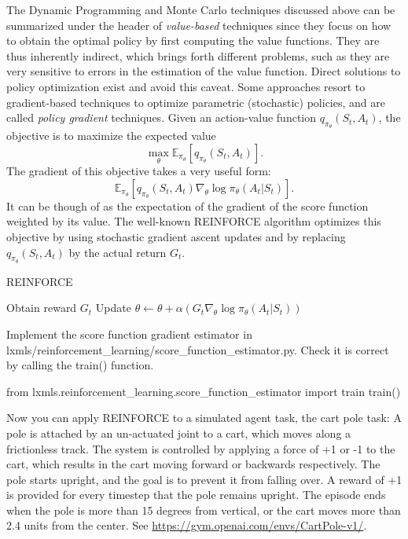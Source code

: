 The Dynamic Programming and Monte Carlo techniques discussed above can be summarized under the header of \emph{value-based} techniques since they focus on how to obtain the optimal policy by first computing the value functions. They are thus inherently indirect, which brings forth different problems, such as they are very sensitive to errors in the estimation of the value function.
 Direct solutions to policy optimization exist and avoid this caveat. Some approaches resort to gradient-based techniques to optimize parametric (stochastic) policies, and are called \emph{policy gradient} techniques. Given an action-value function $q_{\pi_\theta}(S_t,A_t)$, the objective is to maximize the expected value  \[\max_{\theta} \mathbb{E}_{\pi_{\theta}}[q_{\pi_\theta}(S_t,A_t)].\]
The gradient of this objective takes a very useful form:
\[\mathbb{E}_{\pi_{\theta}}[q_{\pi_\theta}(S_t,A_t) \nabla_{\theta} \log \pi_{\theta}(A_t|S_t)].\]
It can be though of as the expectation of the gradient of the score function weighted by its value.
The well-known REINFORCE algorithm optimizes this objective by using stochastic gradient ascent updates and by replacing $q_{\pi_\theta}(S_t,A_t)$ by the actual return $G_t$.

\begin{algorithm}[h!]
\label{algo:reinforce}
   \caption{REINFORCE}
\begin{algorithmic}[1]
\STATE Obtain reward $G_t$%
\STATE Update $\theta \leftarrow \theta + \alpha (
G_t
\nabla_{\theta} \log \pi_{\theta}(A_t|S_t))$
\ENDFOR
	\ENDFOR
\end{algorithmic}
\end{algorithm}



\begin{exercise}
Implement the score function gradient estimator in lxmls/reinforcement\_learning/score\_function\_estimator.py. Check it is correct by calling the train() function.
\begin{python}
from lxmls.reinforcement_learning.score_function_estimator import train
train()
\end{python}
\end{exercise}

Now you can apply REINFORCE to a simulated agent task, the cart pole task: A pole is attached by an un-actuated joint to a cart, which moves along a frictionless track. The system is controlled by applying a force of +1 or -1 to the cart, which results in the cart moving forward or backwards respectively. The pole starts upright, and the goal is to prevent it from falling over. A reward of +1 is provided for every timestep that the pole remains upright. The episode ends when the pole is more than 15 degrees from vertical, or the cart moves more than 2.4 units from the center. See \url{ https://gym.openai.com/envs/CartPole-v1/}.

